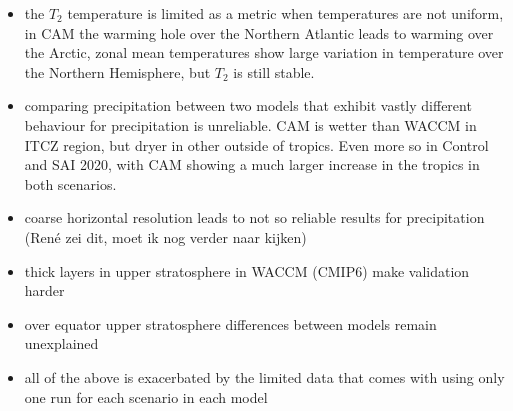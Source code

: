 \begin{itemize}
    \item the $T_2$ temperature is limited as a metric when temperatures are not uniform, in CAM the warming hole over the Northern Atlantic leads to warming over the Arctic, zonal mean temperatures show large variation in temperature over the Northern Hemisphere, but $T_2$ is still stable.
    \item comparing precipitation between two models that exhibit vastly different behaviour for precipitation is unreliable. CAM is wetter than WACCM in ITCZ region, but dryer in other outside of tropics. Even more so in Control and SAI 2020, with CAM showing a much larger increase in the tropics in both scenarios.  
    \item coarse horizontal resolution leads to not so reliable results for precipitation (Ren\'e zei dit, moet ik nog verder naar kijken)
    \item thick layers in upper stratosphere in WACCM (CMIP6) make validation harder
    \item over equator upper stratosphere differences between models remain unexplained
    \item all of the above is exacerbated by the limited data that comes with using only one run for each scenario in each model
\end{itemize}